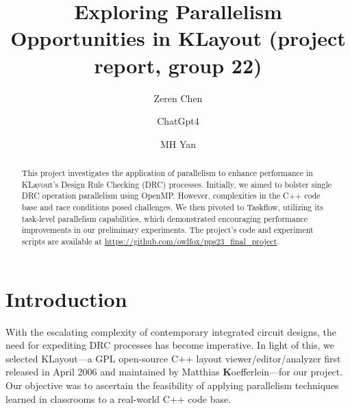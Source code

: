 \documentclass[sigconf]{acmart}
\begin{document}
\title{Exploring Parallelism Opportunities in KLayout (project report, group 22)}

\author{Zeren Chen}


\author{ChatGpt4}

\author{MH Yan }




\renewcommand{\shortauthors}{Zeren et al.}


\begin{abstract}
  This project investigates the application of parallelism to enhance performance in KLayout's Design Rule Checking (DRC) processes. Initially, we aimed to bolster single DRC operation parallelism using OpenMP. However, complexities in the C++ code base and race conditions posed challenges. We then pivoted to Taskflow, utilizing its task-level parallelism capabilities, which demonstrated encouraging performance improvements in our preliminary experiments. The project's code and experiment scripts are available at \href{https://github.com/owlfox/pps23_final_project}{https://github.com/owlfox/pps23\_final\_project}.
\end{abstract}


\maketitle

\section{Introduction}
With the escalating complexity of contemporary integrated circuit designs, the need for expediting DRC processes has become imperative. In light of this, we selected KLayout—a GPL open-source C++ layout viewer/editor/analyzer first released in April 2006 and maintained by Matthias \textbf{K}oefferlein—for our project. Our objective was to ascertain the feasibility of applying parallelism techniques learned in classrooms to a real-world C++ code base.
\end{document}
